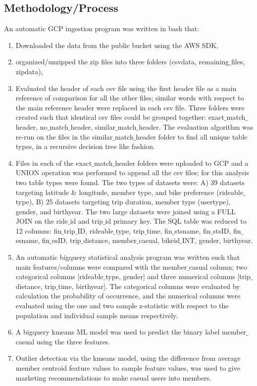 \documentclass[11pt, onecolumn]{article}
\begin{document}
\subsection{Methodology/Process}
An automatic GCP ingestion program was written in bash that: 
\begin{enumerate}
\item Downloaded the data from the public bucket using the AWS SDK,
\item organized/unzipped the zip files into three folders (csvdata, remaining$\_$files, zipdata),
\item Evaluated the header of each csv file using the first header file as a main reference of comparison for all the other files; similar words with respect to the main reference header were replaced in each csv file. Three folders were created such that identical csv files could be grouped together: exact$\_$match$\_$header, no$\_$match$\_$header, similar$\_$match$\_$header. The evaluation algorithm was re-run on the files in the similar$\_$match$\_$header folder to find all unique table types, in a recursive decision tree like fashion.
\item Files in each of the exact$\_$match$\_$header folders were uploaded to GCP and a UNION operation was performed to append all the csv files; for this analysis two table types were found. The two types of datasets were: A) 39 datasets targeting latitude \& longitude, member type, and bike preference (rideable$\_$type), B) 25 datasets targeting trip duration, member type (usertype), gender, and birthyear. The two large datasets were joined using a FULL JOIN on the ride$\_$id and trip$\_$id primary key. The SQL table was reduced to 12 columns: fin$\_$trip$\_$ID, rideable$\_$type, trip$\_$time, fin$\_$stsname, fin$\_$stsID, fin$\_$esname, fin$\_$esID, trip$\_$distance, member$\_$casual, bikeid$\_$INT, gender, birthyear. 
\item An automatic bigquery statistical analysis program was written such that main features/columns were compared with the member$\_$casual column; two categorical columns [rideable$\_$type, gender] and three numerical columns [trip$\_$distance, trip$\_$time, birthyear]. The categorical columns were evaluated by calculation the probability of occurrence, and the numerical columns were evaluated using the one and two sample z-statistic with respect to the population and individual sample means respectively.
\item A bigquery kmeans ML model was used to predict the binary label member$\_$casual using the three features.
\item  Outlier detection via the kmeans model, using the difference from average member centroid feature values to sample feature values, was used to give marketing recommendations to make casual users into members. 
\end{enumerate}
\end{document}
